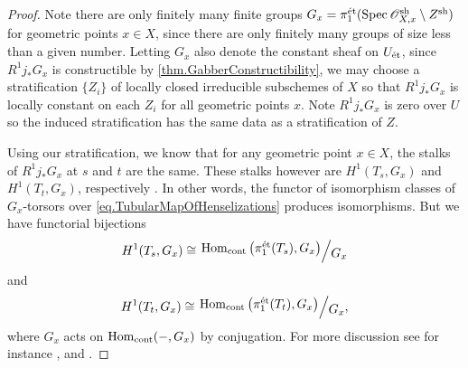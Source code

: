 \documentclass[12pt]{amsart}
\numberwithin{equation}{theorem}
\renewcommand{\:}{\colon}
\newcommand{\piet}{\pi_1^{\textnormal{\'{e}t}}} %
\theoremstyle{theorem}
\def\todo#1{\textcolor{Mahogany}%
{\footnotesize\newline{\color{Mahogany}\fbox{\parbox{\textwidth-15pt}{\textbf{todo:
} #1}}}\newline}}
\renewcommand{\O}{\mathscr O}
\begin{document}
\begin{proof}
Note there are only finitely many finite groups $G_x = \pi_1^{\et}(\Spec \O_{X,x}^{\sh} \setminus Z^{\sh})$ for geometric points $x \in X$, since there are only finitely many groups of size less than a given number.
Letting $G_x$ also denote the constant sheaf on $U_{\textnormal{{\'e}t}}$, since $R^1 j_* G_x$ is constructible by \autoref{thm.GabberConstructibility}, we may choose a stratification $\{ Z_i \}$ of locally closed irreducible subschemes of $X$ so that $R^1 j_* G_x$ is locally constant on each $Z_i$ for all geometric points $x$. Note $R^1 j_* G_x$ is zero over $U$ so the induced stratification has the same data as a stratification of $Z$.

Using our stratification, we know that for any geometric point $x \in X$, the stalks of $R^1 j_* G_x$ at $s$ and $t$ are the same.
These stalks however are $H^1(T_s, G_x)$ and $H^1(T_t, G_x)$, respectively \cite[Chapter III, Theorem 1.15]{MilneEtaleCohomology}.
In other words, the functor of isomorphism classes of $G_x$-torsors over \autoref{eq.TubularMapOfHenselizations} produces isomorphisms.
But we have functorial bijections
\[ H^1(T_s, G_x) \cong \factor \Hom_{\cont} \big( \pi_1^{\et}(T_s), G_x \big). G_x. \]
and
\[ H^1(T_t, G_x) \cong \factor \Hom_{\cont} \big( \pi_1^{\et}(T_t), G_x \big). G_x., \]
where $G_x$ acts on $\operatorname{Hom}_{\operatorname{{cont}}}(-, G_x)$ by conjugation.
For more discussion see for instance \cite[Section 11.5]{GortzWedhornAlgebraicGeoemtryI}, \cite[Example 11.3]{MilneLecturesOnEtaleCohomology} and \cite[Chapter I, Remark 5.4 and Chapter III, Corollary 4.7, Remark 4.8]{MilneEtaleCohomology}.

\end{proof}
\end{document}
